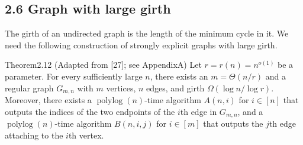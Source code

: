 \subsection*{2.6 Graph with large girth}
The girth of an undirected graph is the length of the minimum cycle in it. We need the following construction of strongly explicit graphs with large girth.
\begin{authorclaim}{Theorem2.12 (Adapted from [27]; see AppendixA)}
Let $r=r(n)=n^{o(1)}$ be a parameter. For every sufficiently large $n$, there exists an $m=\Theta(n/r)$ and a regular graph $G_{m,n}$ with $m$ vertices, $n$ edges, and girth $\Omega(\log n/\log r)$. Moreover, there exists a $\operatorname{polylog}(n)$-time algorithm $A(n,i)$ for $i\in[n]$ that outputs the indices of the two endpoints of the $i$th edge in $G_{m,n}$, and a $\operatorname{polylog}(n)$-time algorithm $B(n,i,j)$ for $i\in[m]$ that outputs the $j$th edge attaching to the $i$th vertex.
\end{authorclaim}
